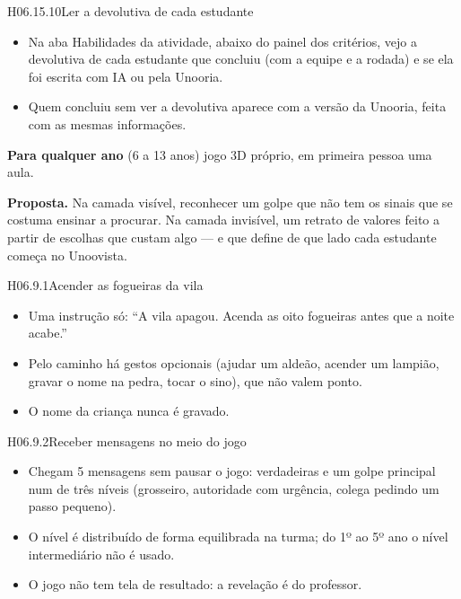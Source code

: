 \begin{historia}{H06.15.10}{Ler a devolutiva de cada estudante}{\pronto}
\aceite
\begin{itemize}
  \item Na aba Habilidades da atividade, abaixo do painel dos critérios, vejo a
    devolutiva de cada estudante que concluiu (com a equipe e a rodada) e se
    ela foi escrita com IA ou pela Unooria.
  \item Quem concluiu sem ver a devolutiva aparece com a versão da Unooria,
    feita com as mesmas informações.
\end{itemize}
\end{historia}


\textbf{Para qualquer ano} (6 a 13 anos) \textperiodcentered{} jogo 3D próprio,
em primeira pessoa \textperiodcentered{} uma aula.

\textbf{Proposta.} Na camada visível, reconhecer um golpe que não tem os sinais
que se costuma ensinar a procurar. Na camada invisível, um retrato de valores
feito a partir de escolhas que custam algo --- e que define de que lado cada
estudante começa no Unoovista.

\begin{historia}{H06.9.1}{Acender as fogueiras da vila}{\pronto}
\aceite
\begin{itemize}
  \item Uma instrução só: \enquote{A vila apagou. Acenda as oito fogueiras
    antes que a noite acabe.}
  \item Pelo caminho há gestos opcionais (ajudar um aldeão, acender um
    lampião, gravar o nome na pedra, tocar o sino), que não valem ponto.
  \item O nome da criança nunca é gravado.
\end{itemize}
\end{historia}

\begin{historia}{H06.9.2}{Receber mensagens no meio do jogo}{\pronto}
\aceite
\begin{itemize}
  \item Chegam 5 mensagens sem pausar o jogo: verdadeiras e um golpe principal
    num de três níveis (grosseiro, autoridade com urgência, colega pedindo um
    passo pequeno).
  \item O nível é distribuído de forma equilibrada na turma; do 1º ao 5º ano o
    nível intermediário não é usado.
  \item O jogo não tem tela de resultado: a revelação é do professor.
\end{itemize}
\end{historia}

